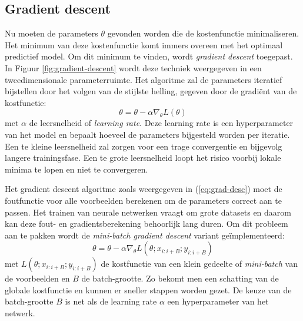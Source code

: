 \subsection{Gradient descent}
\npar Nu moeten de parameters $\theta$ gevonden worden die de kostenfunctie minimaliseren. Het minimum van deze kostenfunctie komt immers overeen met het optimaal predictief model. Om dit minimum te vinden, wordt \textit{gradient descent} toegepast. In Figuur \ref{fig:gradient-descent} wordt deze techniek weergegeven in een tweedimensionale parameterruimte. Het algoritme zal de parameters iteratief bijstellen door het volgen van de stijlste helling, gegeven door de gradi\"ent van de kostfunctie:
\begin{equation}\label{eq:grad-desc}
\theta = \theta - \alpha \nabla_\theta L(\theta)
\end{equation}
met $\alpha$ de leersnelheid of \textit{learning rate}. Deze learning rate is een hyperparameter van het model en bepaalt hoeveel de parameters bijgesteld worden per iteratie. Een te kleine leersnelheid zal zorgen voor een trage convergentie en bijgevolg langere trainingsfase. Een te grote leersnelheid loopt het risico voorbij lokale minima te lopen en niet te convergeren.

\npar Het gradient descent algoritme zoals weergegeven in (\ref{eq:grad-desc}) moet de foutfunctie voor alle voorbeelden berekenen om de parameters correct aan te passen. Het trainen van neurale netwerken vraagt om grote datasets en daarom kan deze fout- en gradientsberekening behoorlijk lang duren. Om dit probleem aan te pakken wordt de \textit{mini-batch gradient descent} variant ge\"implementeerd:
\begin{equation}\label{eq:mini-grad-desc}
\theta = \theta - \alpha \nabla_\theta L(\theta;x_{i:i+B};y_{i:i+B})
\end{equation}
met $L(\theta;x_{i:i+B};y_{i:i+B})$ de kostfunctie van een klein gedeelte of \textit{mini-batch} van de voorbeelden en $B$ de batch-grootte. Zo bekomt men een schatting van de globale kostfunctie en kunnen er sneller stappen worden gezet. De keuze van de batch-grootte $B$ is net als de learning rate $\alpha$ een hyperparameter van het netwerk. 
